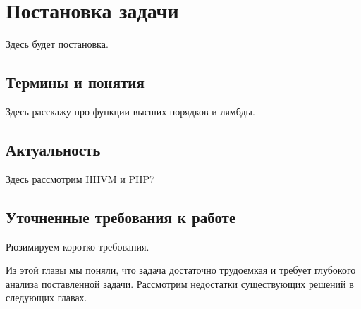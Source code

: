 
\chapter{Постановка задачи}
Здесь будет постановка.

\section{Термины и понятия}
Здесь расскажу про функции высших порядков и лямбды.

\section{Актуальность}
Здесь рассмотрим HHVM и PHP7

\section{Уточненные требования к работе}
Рюзимируем коротко требования.

\chapterconclusion
Из этой главы мы поняли, что задача достаточно трудоемкая и требует глубокого анализа поставленной задачи.
Рассмотрим недостатки существующих решений в следующих главах.



